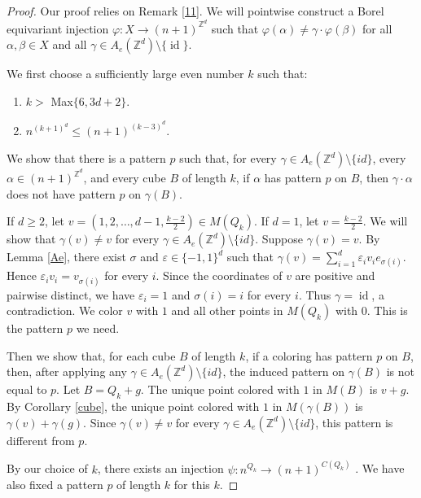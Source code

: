 \documentclass[10pt,a4paper]{amsart}
\newcommand{\id}{\operatorname{id}}
\begin{document}
\begin{proof}
Our proof relies on  Remark  \ref{11}. We will pointwise construct a Borel equivariant injection $\varphi: X\longrightarrow (n+1)^{\mathbb{Z}^d}$ such that $\varphi(\alpha)\ne\gamma\cdot\varphi(\beta)$ for all $\alpha,\beta\in X$ and all $\gamma\in A_e(\mathbb{Z}^d)\setminus\{\id\}$. 

We first choose a sufficiently large even number $k$ such that:
\begin{enumerate}
    \item $k>$ Max$\{6,3d+2\}$.
    \item $n^{(k+1)^d}\leq (n+1)^{(k-3)^d}$.
\end{enumerate}
We  show that there is a pattern $p$ such that, for
every  $\gamma\in A_e(\mathbb{Z}^d)\setminus\{id\}$, every
$\alpha\in (n+1)^{\mathbb{Z}^d}$, and every cube $B$ of length
$k$, if $\alpha$ has pattern $p$ on $B$, then
$\gamma\cdot\alpha$ does not have pattern $p$ on
$\gamma(B)$.
 
If $d\ge 2$, let
$v=(1,2,\dots,d-1,\frac{k-2}{2})\in M(Q_k)$. If $d=1$, let
$v=\frac{k-2}{2}$. We will show that $\gamma(v)\neq v$ for every 
$\gamma\in A_e(\mathbb{Z}^d)\setminus\{id\}$. Suppose $\gamma(v)=v$.
By Lemma \ref{Ae}, there exist $\sigma$ and
$\varepsilon\in\{-1,1\}^d$ such that $\gamma(v)=\sum_{i=1}^d \varepsilon_i v_i e_{\sigma(i)}.$ Hence $\varepsilon_i v_i=v_{\sigma(i)}$ for every $i$. Since the coordinates of $v$ are positive and pairwise distinct, we have $\varepsilon_i=1$ and $\sigma(i)=i$
for every $i$. Thus $\gamma=\id$, a contradiction. We color $v$ with $1$ and
all other points in $M(Q_k)$ with $0$. This is the pattern
$p$ we need.

Then we show that, for each cube $B$ of length $k$, if a
coloring has pattern $p$ on $B$, then, after applying any
 $\gamma\in A_e(\mathbb{Z}^d)\setminus\{id\}$, the induced pattern
on $\gamma(B)$ is not equal to $p$. Let $B=Q_k+g$. The unique
point colored with $1$ in $M(B)$ is $v+g$. By
Corollary \ref{cube},  the unique point colored with $1$ in  $M(\gamma(B))$ is $\gamma(v)+\gamma(g)$. Since
$\gamma(v)\neq v$ for every 
$\gamma\in A_e(\mathbb{Z}^d)\setminus\{id\}$, this  pattern is
different from $p$.



By our choice of $k$, there exists an injection $\psi: n^{Q_k} \longrightarrow (n+1)^{C(Q_k)}$ . We have also fixed a pattern $p$ of length $k$ for this $k$.


\end{proof}
\end{document}

